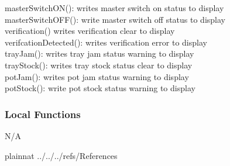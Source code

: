 \documentclass[12pt, titlepage]{article}
\begin{document}
masterSwitchON(): writes master switch on status to display\\
masterSwitchOFF(): write master switch off status to display\\
verification() writes verification clear to display\\
verifcationDetected(): writes verification error to display\\
trayJam(): writes tray jam status warning to display\\
trayStock(): writes tray stock status clear to display\\
potJam(): writes pot jam status warning to display\\
potStock(): write pot stock status warning to display\\

\subsubsection{Local Functions}

N/A

\newpage

 {plainnat}
 {../../../refs/References}

\newpage
\end{document}
